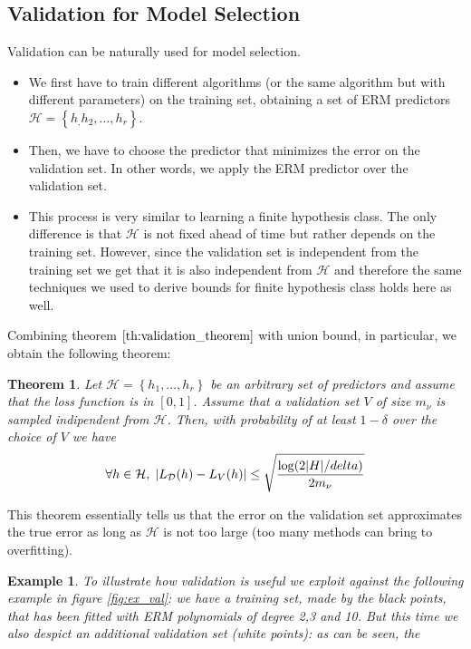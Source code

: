 \documentclass[12pt]{report}
\theoremstyle{plain}
\newtheorem{theorem}{Theorem}[chapter]
\newtheorem{example}{Example}[chapter]
\newcommand\mcl[1]{\mathcal{#1}}
\begin{document}
\begin{flushleft}
\section{Validation for Model Selection}
Validation can be naturally used for model selection.\\
\begin{itemize}
	\item We first have to train different algorithms (or the same algorithm 
	but with different parameters) on the training set, obtaining a set of ERM 
	predictors $\mcl{H}=\left\{h_,h_2,\dots,h_r \right\}$.
	\item Then, we have to choose the predictor that minimizes the error on the 
	validation set. In other words, we apply the ERM predictor over the 
	validation set.
	\item This process is very similar to learning a finite hypothesis class. 
	The only difference is that $\mcl{H}$ is not fixed ahead of time but rather 
	depends on the training set. However, since the validation set is 
	independent from the training set we get that it is also independent from 
	$\mcl{H}$ and therefore the same techniques we used to derive bounds for 
	finite hypothesis class holds here as well.
\end{itemize}
Combining theorem $\ref{th:validation_theorem}$ with union bound, in 
particular, we obtain the 
following theorem:
\begin{theorem}
	Let $\mcl{H}=\left\{h_1,\dots,h_r\right\}$ be an arbitrary set of 
	predictors and assume that the loss function is in $[0,1]$. Assume that a 
	validation set $V$ of size $m_\nu$ is sampled indipendent from $\mcl{H}$. 
	Then, with probability of at least $1-\delta$ over the choice of $V$ we have
	\[ \forall 
	h\in\mcl{H},\;\abs{L_\mcl{D}(h)-L_V(h)}\leq\sqrt{\frac{\log(2\abs{H}/delta)}{2m_\nu}}
	 \]
\end{theorem}
This theorem essentially tells us that the error on the validation set 
approximates the true error as long as $\mcl{H}$ is not too large (too many 
methods can bring to overfitting).\\
\vspace{0.5cm}
\begin{example}
	To illustrate how validation is useful we exploit against the following 
	example in figure \ref{fig:ex_val}: we have a training set, made by the 
	black points, that has been 
	fitted with ERM polynomials of degree 2,3 and 10. But this time we also 
	despict an additional validation set (white points): as can be seen, the 

\end{example}
\end{flushleft}
\end{document}

